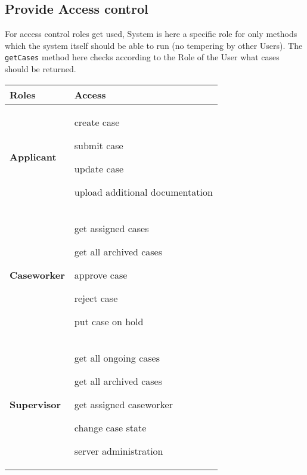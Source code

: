 \newpage
\subsection{Provide Access control}


For access control roles get used, System is here a specific role for only methods which the system itself should be able to run (no tempering by other Users).
The \texttt{getCases} method here checks according to the Role of the User what cases should be returned.

\begin{table}[htb!]
\begin{tabularx}{\textwidth}{l|X}
	\textbf{Roles} & \textbf{Access} \\
	\hline
	\textbf{Applicant} & 
	\begin{compactitem}
	    \item create case
	    \item submit case
	    \item update case
	    \item upload additional documentation
	\end{compactitem} \\
	\hline
	\textbf{Caseworker} & 
	\begin{compactitem} 
	    \item get assigned cases
	    \item get all archived cases
	    \item approve case
	    \item reject case
	    \item put case on hold
	\end{compactitem} \\
	\hline
	\textbf{Supervisor} &
	\begin{compactitem}
	    \item get all ongoing cases
	    \item get all archived cases
	    \item get assigned caseworker
	    \item change case state
	    \item server administration
	\end{compactitem}  \\
\end{tabularx}
\end{table}